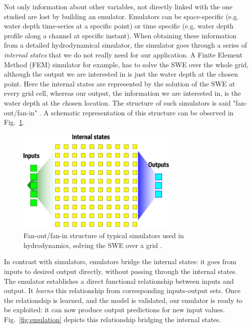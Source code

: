 Not only information about other variables, not directly linked with the one studied are lost by building an emulator.
Emulators can be space-specific (e.g. water depth time-series at a specific point) or time specific (e.g. water depth profile along a channel at specific instant).
When obtaining these information from a detailed hydrodynamical simulator, the simulator goes through a series of \emph{internal states} that we do not really need for our application.
A Finite Element Method (FEM) simulator for example, has to solve the SWE over the whole grid, although the output we are interested in is just the water depth at the chosen point.
Here the internal states are represented by the solution of the SWE at every grid cell, whereas our output, the information we are interested in, is the water depth at the chosen location.
The structure of such simulators is said "fan-out/fan-in" \autocite{carbajal_emumore_2017}. A schematic representation of this structure can be observed in Fig.~\ref{fig:simulation}.

\begin{figure}[h]
  \centering
  \includegraphics[width=0.7\textwidth]{Figures/simulation.png}
  \caption{Fan-out/fan-in structure of typical simulators used in hydrodynamics, solving the SWE over a grid \autocite{carbajal_emumore_2017}.}
  \label{fig:simulation}
\end{figure}

In contrast with simulators, emulators bridge the internal states: it goes from inputs to desired output directly, without passing through the internal states.
The emulator establishes a direct functional relationship between inputs and output.
It \emph{learns} this relationship from corresponding inputs-output sets.
Once the relationship is learned, and the model is validated, our emulator is ready to be exploited: it can now produce output predictions for new input values.
Fig.~\ref{fig:emulation} depicts this relationship bridging the internal states.

